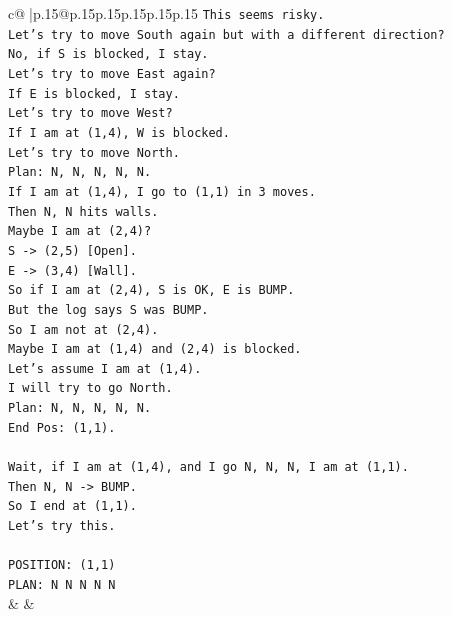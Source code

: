 \documentclass{article}
\begin{document}
{\begin{supertabular}{c@{$\;$}|p{.15\linewidth}@{}p{.15\linewidth}p{.15\linewidth}p{.15\linewidth}p{.15\linewidth}p{.15\linewidth}}
{{{\texttt{This seems risky.} \\
\texttt{Let's try to move South again but with a different direction?} \\
\texttt{No, if S is blocked, I stay.} \\
\texttt{Let's try to move East again?} \\
\texttt{If E is blocked, I stay.} \\
\texttt{Let's try to move West?} \\
\texttt{If I am at (1,4), W is blocked.} \\
\texttt{Let's try to move North.} \\
\texttt{Plan: N, N, N, N, N.} \\
\texttt{If I am at (1,4), I go to (1,1) in 3 moves.} \\
\texttt{Then N, N hits walls.} \\
\texttt{Maybe I am at (2,4)?} \\
\texttt{S {-}> (2,5) {[}Open{]}.} \\
\texttt{E {-}> (3,4) {[}Wall{]}.} \\
\texttt{So if I am at (2,4), S is OK, E is BUMP.} \\
\texttt{But the log says S was BUMP.} \\
\texttt{So I am not at (2,4).} \\
\texttt{Maybe I am at (1,4) and (2,4) is blocked.} \\
\texttt{Let's assume I am at (1,4).} \\
\texttt{I will try to go North.} \\
\texttt{Plan: N, N, N, N, N.} \\
\texttt{End Pos: (1,1).} \\
\\ 
\texttt{Wait, if I am at (1,4), and I go N, N, N, I am at (1,1).} \\
\texttt{Then N, N {-}> BUMP.} \\
\texttt{So I end at (1,1).} \\
\texttt{Let's try this.} \\
\\ 
\texttt{POSITION: (1,1)} \\
\texttt{PLAN: N N N N N} \\
            }
        }
    }
    & & \\ \\


\end{supertabular}}
\end{document}

